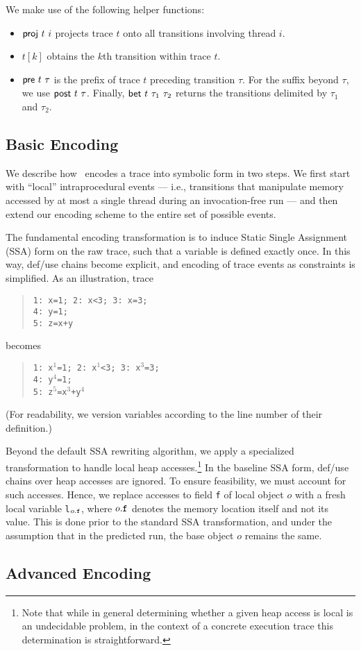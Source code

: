We make use of the following helper functions:
\begin{itemize}
	\item ${\sf proj}\ t\ i$ projects trace $t$ onto all transitions involving thread $i$.
	\item $t[k]$ obtains the $k$th transition within trace $t$.
	\item ${\sf pre}\ t\ \tau$ is the prefix of trace $t$ preceding transition $\tau$. For the suffix beyond $\tau$, we 
	use ${\sf post}\ t\ \tau$. Finally, ${\sf bet}\ t\ \tau_1\ \tau_2$ returns the transitions delimited by $\tau_1$ and $\tau_2$.
\end{itemize}

\subsection{Basic Encoding}

We describe how \tool\ encodes a trace into symbolic form in two steps. We first start with ``local'' intraprocedural events --- i.e., 
transitions that manipulate memory accessed by at most a single thread during an invocation-free run --- and then extend our encoding scheme to the entire set of possible events.

The fundamental encoding transformation is to induce Static Single Assignment (SSA) form on the raw trace, such that
a variable is defined exactly once. In this way, def/use chains become explicit, and encoding of trace events as constraints is simplified. As an illustration, trace
\begin{quote}
	{\tt 1: x=1; 2: x<3; 3: x=3;} \\
	{\tt 4: y=1;} \\
	{\tt 5: z=x+y}
\end{quote}
becomes
\begin{quote}
	{\tt 1: x$^1$=1; 2: x$^1$<3; 3: x$^3$=3;} \\
	{\tt 4: y$^4$=1;} \\
	{\tt 5: z$^5$=x$^3$+y$^4$}
\end{quote}
(For readability, we version variables according to the line number of their definition.)

Beyond the default SSA rewriting algorithm, we apply a specialized transformation to handle local heap accesses.\footnote{
	Note that while in general determining whether a given heap access is local is an undecidable problem, in the context
	of a concrete execution trace this determination is straightforward.
} In the baseline SSA form, def/use chains over heap accesses are ignored. To ensure feasibility, we must account for such accesses. Hence, we replace accesses to field {\tt f} of local object $o$ with a fresh local variable {\tt l$_{o{\tt .f}}$}, where $o{\tt .f}$ denotes the memory location itself and not its value. This is done prior to the standard SSA transformation, and under the assumption that in the predicted run, the base object $o$ remains the same.

\subsection{Advanced Encoding}
